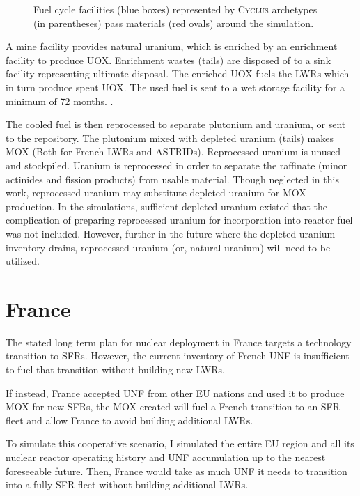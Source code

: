 \documentclass{article}
\newcommand{\Cyclus}{\textsc{Cyclus}\xspace}%
\begin{document}
\begin{figure}
{\begin{tikzpicture}[align=center, node distance = 3cm and 3cm, auto]
                \end{tikzpicture}
        
                }
                \caption{Fuel cycle facilities (blue boxes) represented by 
                        \Cyclus archetypes (in parentheses) pass materials (red 
                ovals) around the simulation.} 
                \label{diag:fc}
\end{figure}

A mine facility provides natural uranium, which is enriched by an enrichment
facility to produce \gls{UOX}. Enrichment wastes (tails) are disposed of to a 
sink facility representing ultimate disposal. The enriched \gls{UOX} fuels
the \glspl{LWR} which in turn produce spent \gls{UOX}. The used fuel
is sent to a wet storage facility for a minimum of 72 months. \cite{carre_overview_2009}.

The cooled fuel is then reprocessed to separate plutonium and uranium,
or sent to the repository.
The plutonium mixed with depleted uranium (tails) makes \gls{MOX} (Both for
French \glspl{LWR} and \glspl{ASTRID}).
Reprocessed uranium is unused and stockpiled. Uranium is reprocessed
in order to separate the raffinate (minor actinides and fission products)
from usable material. Though neglected in this work, reprocessed
uranium may substitute depleted uranium for \gls{MOX} production. In the
simulations, sufficient depleted uranium existed that the complication of
preparing reprocessed uranium for incorporation into reactor fuel
was not included. However, further in the future where the depleted
uranium inventory drains, reprocessed uranium (or, natural uranium) will need to be utilized. 

\FloatBarrier


\section{France}
The stated long term plan for nuclear deployment in France targets a technology 
transition to \glspl{SFR}\cite{cne2_reports_2015}. However, the current inventory of French \gls{UNF} 
is insufficient to fuel that transition without building new \glspl{LWR}.

If instead, France accepted 
\gls{UNF} from other \gls{EU} nations and used it to produce \gls{MOX} for new \glspl{SFR},
the \gls{MOX} created will fuel a French transition to an \gls{SFR} fleet
and allow France to avoid building additional \glspl{LWR}.

To simulate this cooperative scenario, I simulated the entire \gls{EU} region
and all its nuclear reactor operating history and \gls{UNF} accumulation up to the
nearest foreseeable future. Then, France would take as much \gls{UNF} it needs
to transition into a fully \gls{SFR} fleet without building additional \glspl{LWR}.
\end{document}
